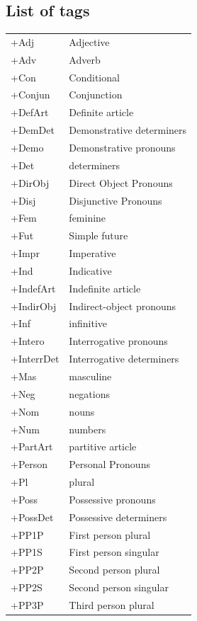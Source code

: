 \documentclass[11pt,letterpaper]{article}
\begin{document}
\subsection*{List of tags}
\begin{table}
    \begin{tabular}{ll}
		+Adj & Adjective \\
		+Adv & Adverb \\
		+Con & Conditional \\
		+Conjun & Conjunction \\
		+DefArt & Definite article \\
		+DemDet & Demonstrative determiners \\
		+Demo & Demonstrative pronouns \\
		+Det & determiners \\
		+DirObj & Direct Object Pronouns \\
		+Disj & Disjunctive Pronouns \\
		+Fem & feminine \\
		+Fut & Simple future \\
		+Impr & Imperative \\
		+Ind & Indicative \\
		+IndefArt & Indefinite article \\
		+IndirObj & Indirect-object pronouns \\
		+Inf & infinitive \\
		+Intero & Interrogative pronouns \\
		+InterrDet & Interrogative determiners \\
		+Mas & masculine \\
		+Neg & negations \\
		+Nom & nouns \\
		+Num & numbers \\
		+PartArt & partitive article \\
		+Person & Personal Pronouns \\
		+Pl & plural \\
		+Poss & Possessive pronouns \\
		+PossDet & Possessive determiners \\
		+PP1P & First person plural \\
		+PP1S & First person singular \\
		+PP2P & Second person plural \\
		+PP2S & Second person singular \\
		+PP3P & Third person plural \\

\end{tabular}
\end{table}
\end{document}

